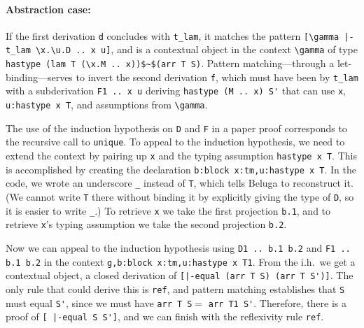  \paragraph{Abstraction case:}
  If the first derivation \lstinline{d} concludes with \lstinline{t_lam}, it matches
 the pattern \lstinline{[\gamma |-t_lam \x.\u.D .. x u]}, and is
 a contextual object in the context \lstinline!\gamma! of type
 \lstinline{hastype (lam T (\x.M .. x))$~$(arr T S)}.
 Pattern matching---through a let-binding---serves to invert the second derivation \lstinline{f}, which
 must have been by \lstinline{t_lam} with a subderivation
 \lstinline{F1 .. x u} deriving \lstinline{hastype (M .. x) S'} that can use \lstinline{x},
 \lstinline{u:hastype x T}, and assumptions from \lstinline!\gamma!.

 The use of the induction hypothesis on \lstinline{D} and \lstinline{F} in a paper proof
 corresponds to the recursive call to \lstinline{unique}.  To appeal to the
 induction hypothesis, we need to extend the context by pairing up \lstinline{x} and
 the typing assumption \lstinline!hastype x T!. This is accomplished by creating
 the declaration \lstinline!b:block x:tm,u:hastype x T!.  In the
 code, we wrote an underscore \lstinline!_! instead of \lstinline{T},
 which tells Beluga to reconstruct it.  (We cannot write \lstinline{T} there without binding it by
 explicitly giving the type of \lstinline{D}, so it is easier to write \lstinline!_!.)
 To retrieve \lstinline{x} we take the first projection
 \lstinline{b.1}, and to retrieve \lstinline{x}'s typing assumption we take the second projection \lstinline{b.2}.

 Now we can appeal to the induction hypothesis using
 \lstinline!D1 .. b.1 b.2! and \lstinline!F1 .. b.1 b.2! in the context
 \lstinline!g,b:block x:tm,u:hastype x T1!.
  From the i.h.\ we get a
 contextual object, a closed derivation of
 \lstinline![|-equal (arr T S) (arr T S')]!. The only rule that could
 derive this is \lstinline{ref}, and pattern matching establishes that \lstinline{S}
 must equal \lstinline{S'}, since we must have \lstinline!arr T S!$ =$
\lstinline!arr T1 S'!.  Therefore, there is a proof of
\lstinline![ |-equal S S']!,
 and we can finish with the reflexivity rule \lstinline{ref}.

